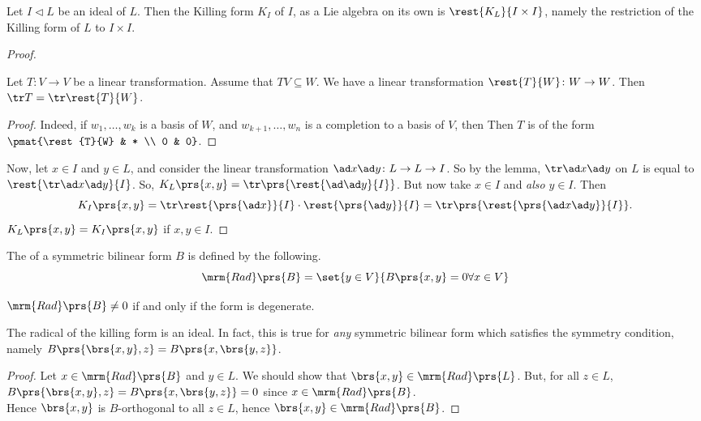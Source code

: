 \documentclass[10pt,a4paper,twoside,openany,hidelinks]{book}
\begin{document}
\begin{proposition}
Let $I \triangleleft L$ be an ideal of $L$. Then the Killing form $K_I$ of $I$, as a Lie algebra on its own is $\rest{K_L}{I \times I}$, namely the restriction of the Killing form of $L$ to $I \times I$.
\end{proposition}
\begin{proof}
\begin{lemma}
Let $T \colon V \to V$ be a linear transformation. Assume that $TV \subseteq W$. We have a linear transformation $\rest{T}{W} \colon W \to W$. Then $\tr T = \tr \rest{T}{W}$.
\end{lemma}
\begin{proof}
Indeed, if $w_1, \ldots, w_k$ is a basis of $W$, and $w_{k+1}, \ldots, w_n$ is a completion to a basis of $V$, then Then $T$ is of the form $\pmat{\rest{T}{W} & * \\ 0 & 0}$.
\end{proof}
Now, let $x \in I$ and $y \in L$, and consider the linear transformation $\ad x \ad y \colon L \to L \to I$. So by the lemma, $\tr \ad x \ad y$ on $L$ is equal to $\rest{\tr \ad x \ad y}{I}$. So, $K_L\prs{x,y} = \tr \prs{\rest{\ad \ad y}{I}}$. But now take $x \in I$ and \emph{also} $y \in I$.
Then \[K_I\prs{x,y} = \tr\rest{\prs{\ad x}}{I} \cdot \rest{\prs{\ad y}}{I} = \tr\prs{\rest{\prs{\ad x \ad y}}{I}} \text{.}\]
$K_L\prs{x,y} = K_I\prs{x,y}$ if $x,y \in I$.
\end{proof}

\begin{definition}
The  of a symmetric bilinear form $B$ is defined by the following.
\[\mrm{Rad}\prs{B} = \set{y \in V}{B\prs{x,y} = 0 \forall x \in V}\]
\end{definition}

\begin{remark}
$\mrm{Rad}\prs{B} \neq 0$ if and only if the form is degenerate.
\end{remark}

\begin{proposition}
The radical of the killing form is an ideal. In fact, this is true for \emph{any} symmetric bilinear form which satisfies the symmetry condition, namely $B\prs{\brs{x,y},z} = B\prs{x,\brs{y,z}}$.
\end{proposition}

\begin{proof}
Let $x \in \mrm{Rad}\prs{B}$ and $y \in L$. We should show that $\brs{x,y} \in \mrm{Rad}\prs{L}$. But, for all $z \in L$, $B\prs{\brs{x,y},z} = B\prs{x,\brs{y,z}} = 0$ since $x \in \mrm{Rad}\prs{B}$.\\
Hence $\brs{x,y}$ is $B$-orthogonal to all $z \in L$, hence $\brs{x,y} \in \mrm{Rad}\prs{B}$.
\end{proof}
\end{document}
